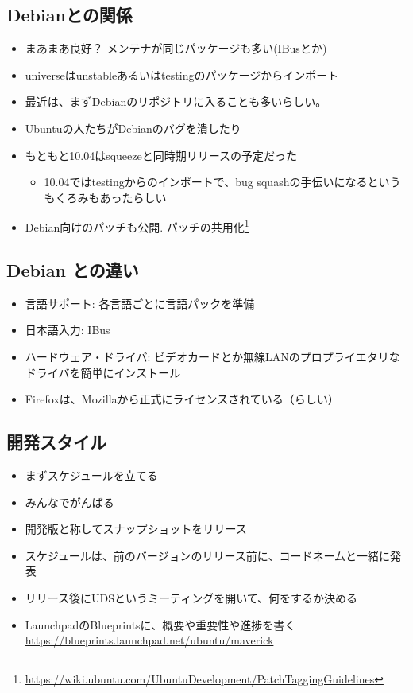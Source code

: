 \documentclass[mingoth,a4paper]{jsarticle}
\begin{document}
\begin{multicols}{2}
\subsection{Debianとの関係}
\begin{itemize}
      \item まあまあ良好？ メンテナが同じパッケージも多い(IBusとか)
      \item universeはunstableあるいはtestingのパッケージからインポート
      \item 最近は、まずDebianのリポジトリに入ることも多いらしい。
      \item Ubuntuの人たちがDebianのバグを潰したり
      \item もともと10.04はsqueezeと同時期リリースの予定だった
    \begin{itemize}
          \item 10.04ではtestingからのインポートで、bug squashの手伝いになるというもくろみもあったらしい
    \end{itemize}
    \item Debian向けのパッチも公開. 
  パッチの共用化\footnote{\url{https://wiki.ubuntu.com/UbuntuDevelopment/PatchTaggingGuidelines}}
\end{itemize}


\subsection{Debian との違い}
\begin{itemize}
      \item 言語サポート: 各言語ごとに言語パックを準備
      \item 日本語入力: IBus 
      \item ハードウェア・ドライバ: ビデオカードとか無線LANのプロプライエタリなドライバを簡単にインストール
      \item Firefoxは、Mozillaから正式にライセンスされている（らしい）
\end{itemize}

\subsection{開発スタイル}
 
  \begin{itemize}
        \item まずスケジュールを立てる
        \item みんなでがんばる
        \item 開発版と称してスナップショットをリリース
        \item スケジュールは、前のバージョンのリリース前に、コードネームと一緒に発表
        \item リリース後にUDSというミーティングを開いて、何をするか決める
        \item LaunchpadのBlueprintsに、概要や重要性や進捗を書く\\
      \url{https://blueprints.launchpad.net/ubuntu/maverick}
  \end{itemize}


\end{multicols}
\end{document}
